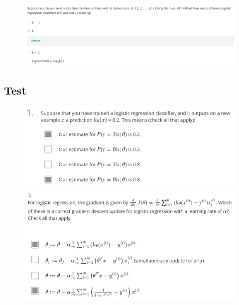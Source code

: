 \documentclass[12pt, A4,onecolumn]{article} %
\begin{document}
\begin{figure}[H]
	\centering
	\includegraphics[width=1\textwidth]{./Imagenes/testMulticlass}
\end{figure}
\newpage

\subsection{Test}

\begin{figure}[H]
  \includegraphics[width=\linewidth]{./Imagenes/testFLogicReg1}
\endminipage\hfill
{}
  \includegraphics[width=\linewidth]{./Imagenes/testFLogicReg3}
\endminipage\hfill
\end{figure}
\end{document}

